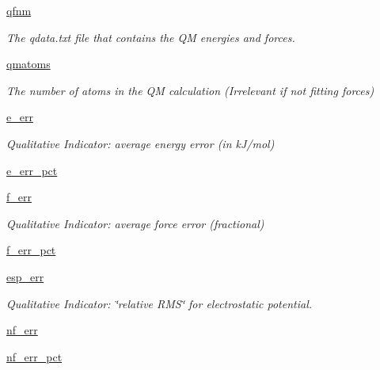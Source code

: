 \begin{DoxyCompactItemize}
\hyperlink{classforcebalance_1_1abinitio_1_1AbInitio_af8f5ab3fd98876e7ea923ed90c48e66d}{qfnm}
\begin{DoxyCompactList}\small\item\em \-The qdata.\-txt file that contains the \-Q\-M energies and forces. \end{DoxyCompactList}\item 
\hyperlink{classforcebalance_1_1abinitio_1_1AbInitio_a45edac867fa720c26a6f959c3dd5a139}{qmatoms}
\begin{DoxyCompactList}\small\item\em \-The number of atoms in the \-Q\-M calculation (\-Irrelevant if not fitting forces) \end{DoxyCompactList}\item 
\hyperlink{classforcebalance_1_1abinitio_1_1AbInitio_a003717f2442aac7d1067e74b89a14cc7}{e\-\_\-err}
\begin{DoxyCompactList}\small\item\em \-Qualitative \-Indicator\-: average energy error (in k\-J/mol) \end{DoxyCompactList}\item 
\hyperlink{classforcebalance_1_1abinitio_1_1AbInitio_ac04e91428155e8d5c4a1a14328e9cc99}{e\-\_\-err\-\_\-pct}
\item 
\hyperlink{classforcebalance_1_1abinitio_1_1AbInitio_a2df838b5d83710d5d35e3ccccbf7c656}{f\-\_\-err}
\begin{DoxyCompactList}\small\item\em \-Qualitative \-Indicator\-: average force error (fractional) \end{DoxyCompactList}\item 
\hyperlink{classforcebalance_1_1abinitio_1_1AbInitio_a0c48a57c247e6afe97fd178e8b5bce0d}{f\-\_\-err\-\_\-pct}
\item 
\hyperlink{classforcebalance_1_1abinitio_1_1AbInitio_a3a1a04d4af74efa8ff6a1fb8bb6bcc10}{esp\-\_\-err}
\begin{DoxyCompactList}\small\item\em \-Qualitative \-Indicator\-: \char`\"{}relative R\-M\-S\char`\"{} for electrostatic potential. \end{DoxyCompactList}\item 
\hyperlink{classforcebalance_1_1abinitio_1_1AbInitio_a6f22f2576168b879342fb60913ffc134}{nf\-\_\-err}
\item 
\hyperlink{classforcebalance_1_1abinitio_1_1AbInitio_a73def1269c075f82fe20dae6117d75bb}{nf\-\_\-err\-\_\-pct}
\item 

\end{DoxyCompactItemize}
